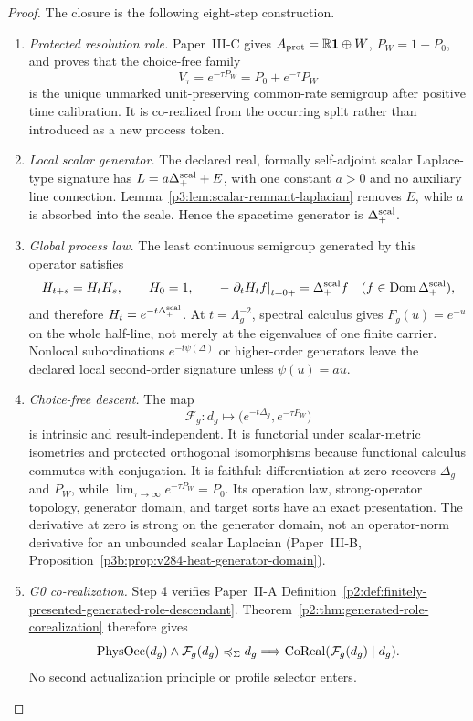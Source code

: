 \documentclass[12pt,a4paper]{article}
\begin{document}
\begin{proof}
The closure is the following eight-step construction.
\begin{enumerate}[label=\arabic*.,leftmargin=2.2em]
\item \emph{Protected resolution role.}
Paper~III-C gives
\(A_{\rm prot}=\mathbb R\mathbf1\oplus W\),
\(P_W=1-P_0\), and proves that the choice-free family
\[
 V_\tau=e^{-\tau P_W}=P_0+e^{-\tau}P_W
\]
is the unique unmarked unit-preserving common-rate semigroup after positive
time calibration.  It is co-realized from the occurring split rather than
introduced as a new process token.

\item \emph{Local scalar generator.}
The declared real, formally self-adjoint scalar Laplace-type signature has
\(L=a\Delta_+^{\rm scal}+E\), with one constant \(a>0\) and no auxiliary
line connection.  Lemma~\ref{p3:lem:scalar-remnant-laplacian} removes \(E\),
while \(a\) is absorbed into the scale.  Hence the spacetime generator is
\(\Delta_+^{\rm scal}\).

\item \emph{Global process law.}
The least continuous semigroup generated by this operator satisfies
\[
 H_{t+s}=H_tH_s,\qquad H_0=1,\qquad
 -\left.\partial_tH_t f\right|_{t=0+}=\Delta_+^{\rm scal}f
 \quad(f\in\operatorname{Dom}\Delta_+^{\rm scal}),
\]
and therefore \(H_t=e^{-t\Delta_+^{\rm scal}}\).  At
\(t=\Lambda_g^{-2}\), spectral calculus gives \(F_g(u)=e^{-u}\) on the
whole half-line, not merely at the eigenvalues of one finite carrier.
Nonlocal subordinations \(e^{-t\psi(\Delta)}\) or higher-order generators
leave the declared local second-order signature unless \(\psi(u)=au\).

\item \emph{Choice-free descent.}
The map
\[
 \mathcal F_g:d_g\longmapsto
 \bigl(e^{-t\Delta_g},e^{-\tau P_W}\bigr)
\]
is intrinsic and result-independent.  It is functorial under scalar-metric
isometries and protected orthogonal isomorphisms because functional calculus
commutes with conjugation.  It is faithful: differentiation at zero recovers
\(\Delta_g\) and \(P_W\), while
\(\lim_{\tau\to\infty}e^{-\tau P_W}=P_0\).  Its operation law, strong-operator topology, generator domain, and
target sorts have an exact presentation.  The derivative at zero is
strong on the generator domain, not an operator-norm derivative for an
unbounded scalar Laplacian (Paper~III-B,
Proposition~\ref{p3b:prop:v284-heat-generator-domain}).

\item \emph{G0 co-realization.}
Step 4 verifies Paper~II-A
Definition~\ref{p2:def:finitely-presented-generated-role-descendant}.
Theorem~\ref{p2:thm:generated-role-corealization} therefore gives
\[
 \operatorname{PhysOcc}(d_g)\wedge\mathcal F_g(d_g)\preccurlyeq_\Sigma d_g
 \Longrightarrow
 \operatorname{CoReal}(\mathcal F_g(d_g)\mid d_g).
\]
No second actualization principle or profile selector enters.


\end{enumerate}
\end{proof}
\end{document}
